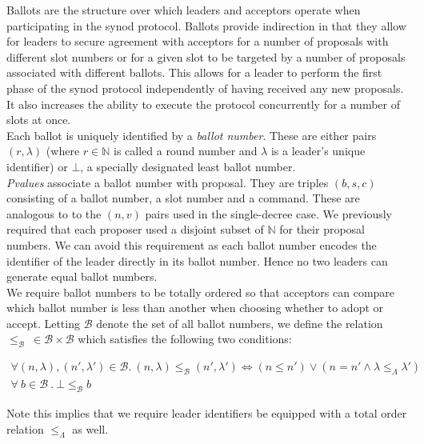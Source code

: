 Ballots are the structure over which leaders and acceptors operate when participating in the synod protocol. Ballots provide indirection in that they allow for leaders to secure agreement with acceptors for a number of proposals with different slot numbers or for a given slot to be targeted by a number of proposals associated with different ballots. This allows for a leader to perform the first phase of the synod protocol independently of having received any new proposals. It also increases the ability to execute the protocol concurrently for a number of slots at once. \\

Each ballot is uniquely identified by a \emph{ballot number}. These are either pairs $\left(r, \lambda\right)$ (where $r \in \mathbb{N}$ is called a round number and $\lambda$ is a leader's unique identifier) or $\bot$, a specially designated least ballot number. \\

\emph{Pvalues} associate a ballot number with proposal. They are triples $\left(b, s, c \right)$ consisting of a ballot number, a slot number and a command. These are analogous to to the $\left( n, v \right)$ pairs used in the single-decree case. We previously required that each proposer used a disjoint subset of $\mathbb{N}$ for their proposal numbers. We can avoid this requirement as each ballot number encodes the identifier of the leader directly in its ballot number. Hence no two leaders can generate equal ballot numbers.\\

We require ballot numbers to be totally ordered so that acceptors can compare which ballot number is less than another when choosing whether to adopt or accept. Letting $\mathcal{B}$ denote the set of all ballot numbers, we define the relation $\leq_{\mathcal{B}} \ \in \mathcal{B} \times \mathcal{B}$ which satisfies the following two conditions:

\begin{gather*}
  \forall \left( n, \lambda \right), \left( n', \lambda' \right) \in \mathcal{B} .
 \ \left( n, \lambda \right) \leq_{\mathcal{B}} \left( n', \lambda' \right) \iff
   \left ( n \leq n' \right) \vee \left( n = n' \wedge \lambda \leq_{\Lambda} \lambda' \right) \\
\forall \ b \in \mathcal{B} \ . \ \bot \leq_{\mathcal{B}} b
\end{gather*}  

Note this implies that we require leader identifiers be equipped with a total order relation  $\leq_{\Lambda}$ as well. \\


